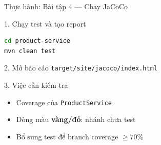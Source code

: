 \documentclass[aspectratio=169,12pt]{beamer}
\begin{document}
\begin{frame}[fragile]{Thực hành: Bài tập 4 --- Chạy JaCoCo}
  \Large
  \begin{block}{1. Chạy test và tạo report}
\begin{lstlisting}[language=bash,style=nonumber,basicstyle=\ttfamily\large]
cd product-service
mvn clean test
\end{lstlisting}
  \end{block}

  \begin{block}{2. Mở báo cáo}
    \texttt{target/site/jacoco/index.html}
  \end{block}

  \begin{block}{3. Việc cần kiểm tra}
    \begin{itemize}
      \item Coverage của \texttt{ProductService}
      \item Dòng màu \textbf{vàng/đỏ}: nhánh chưa test
      \item Bổ sung test để branch coverage $\geq 70\%$
    \end{itemize}
  \end{block}
\end{frame}
\end{document}

